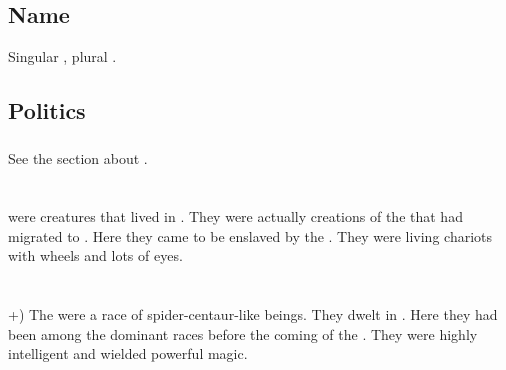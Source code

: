 \subsection{Name}
Singular \emph{\mothlan}, plural \emph{\mothlain}. 









\subsection{Politics}





\subsubsection{\Umbrae}
See the section about . 


















\section{\Ophan}
\index{\ophan}
\Ophanim were creatures that lived in \Nyx.
They were actually creations of the \banes that had migrated to \Nyx.
Here they came to be enslaved by the \resphain.
They were living chariots with wheels and lots of eyes.



















\section{\Ozurians}
+)
The \ozurians were a race of spider-centaur-like beings. 
They dwelt in \Nyx. 
Here they had been among the dominant races before the coming of the \resphain. 
They were highly intelligent and wielded powerful magic. 



















